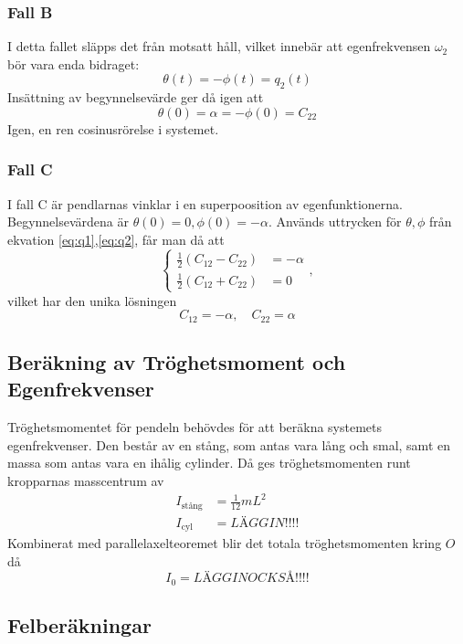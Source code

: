 \subsubsection{Fall B}
I detta fallet släpps det från motsatt håll, vilket innebär att egenfrekvensen $\omega_2$ bör vara enda bidraget:
\begin{equation}
    \theta(t)=-\phi(t) = q_2(t)
\end{equation}
Insättning av begynnelsevärde ger då igen att \begin{equation}
    \theta(0)=\alpha=-\phi(0) = C_{22}
\end{equation}
Igen, en ren cosinusrörelse i systemet.

\subsubsection{Fall C}
I fall C är pendlarnas vinklar i en superpoosition av egenfunktionerna. Begynnelsevärdena är $\theta(0)=0, \phi(0)=-\alpha$. Används uttrycken för $\theta,\phi$ från ekvation \ref{eq:q1},\ref{eq:q2},  får man då att \begin{equation}
    \begin{cases}
        \frac{1}{2}(C_{12}-C_{22})&=-\alpha\\
        \frac{1}{2}(C_{12}+C_{22})&=0
    \end{cases},
\end{equation}
vilket har den unika lösningen \begin{equation}
    C_{12} = -\alpha, \quad C_{22} = \alpha
\end{equation}

\subsection{Beräkning av Tröghetsmoment och Egenfrekvenser}
Tröghetsmomentet för pendeln behövdes för att beräkna systemets egenfrekvenser. Den består av en stång, som antas vara lång och smal, samt en massa som antas vara en ihålig cylinder. Då ges tröghetsmomenten runt kropparnas masscentrum av \cite{nordling_physics_2021}
\begin{align}
    I_{\textrm{stång}} &= \frac{1}{12}mL^2\\
    I_\textrm{cyl} &= LÄGG IN!!!!
\end{align}
Kombinerat med parallelaxelteoremet blir det totala tröghetsmomenten kring $O$ då 
\begin{equation}
    I_0 = LÄGG IN OCKSÅ!!!!
\end{equation}

\subsection{Felberäkningar}